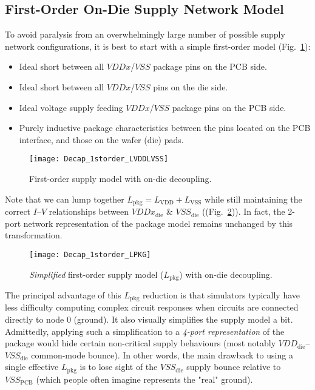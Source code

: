 \subsection{First-Order On-Die Supply Network Model}
\par To avoid paralysis from an overwhelmingly large number of possible supply
network configurations, it is best to start with a simple first-order model
(Fig.~\ref{fig:Decap_1storder_LVDDLVSS}):
%
\begin{itemize}[noitemsep]
\item Ideal short between all $VDDx$/$VSS$ package pins on the PCB side.
\item Ideal short between all $VDDx$/$VSS$ pins on the die side.
\item Ideal voltage supply feeding $VDDx$/$VSS$ package pins on the PCB side.
\item Purely inductive package characteristics between the pins located on the PCB interface, and those on the wafer (die) pads.
\end{itemize}
%
\begin{figure}[!ht]
	\centering
	\texttt{[image: Decap\_1storder\_LVDDLVSS]}
	\caption{First-order supply model with on-die decoupling.}
\label{fig:Decap_1storder_LVDDLVSS}%
\end{figure}
%
\par Note that we can lump together $L_\mathrm{pkg}=L_\mathrm{VDD}+L_\mathrm{VSS}$
while still maintaining the correct $I$--$V$ relationships between
$VDDx_\mathrm{die}$ \& $VSS_\mathrm{die}$ ((Fig.~\ref{fig:Decap_1storder})).
In fact, the 2-port network representation of the package model remains
unchanged by this transformation.
%
\begin{figure}[!ht]
	\centering
	\texttt{[image: Decap\_1storder\_LPKG]}
	\caption{\emph{Simplified} first-order supply model ($L_\mathrm{pkg}$) with on-die decoupling.}
\label{fig:Decap_1storder}%
\end{figure}
%
\par The principal advantage of this $L_\mathrm{pkg}$ reduction is that
simulators typically have less difficulty computing complex circuit responses
when circuits are connected directly to node 0 (ground). It also visually
simplifies the supply model a bit. Admittedly, applying such a simplification to
a \emph{4-port representation} of the package would hide certain non-critical
supply behaviours (most notably $VDD_\mathrm{die}$--$VSS_\mathrm{die}$
common-mode bounce).  In other words, the main drawback to using a single
effective $L_\mathrm{pkg}$ is to lose sight of the $VSS_\mathrm{die}$ supply
bounce relative to $VSS_\mathrm{PCB}$ (which people often imagine represents
the "real" ground).
%
